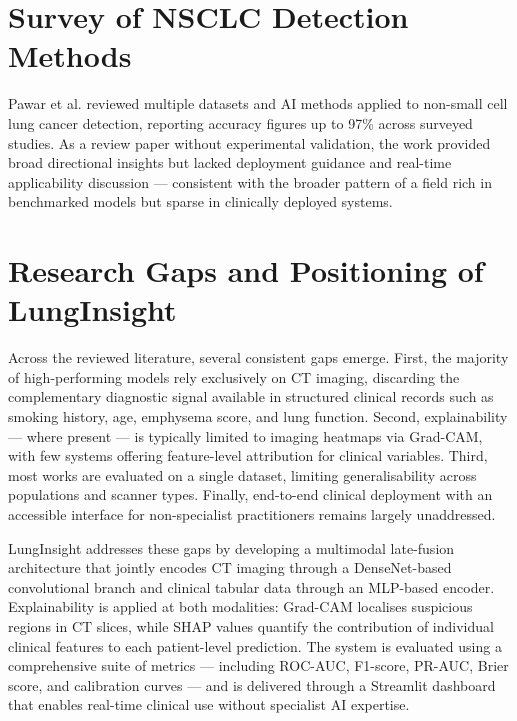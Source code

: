 {%
\section{Survey of NSCLC Detection Methods}

Pawar et al. \cite{pawar2025} reviewed multiple datasets and AI methods applied to
non-small cell lung cancer detection, reporting accuracy figures up to 97\% across
surveyed studies. As a review paper without experimental validation, the work provided
broad directional insights but lacked deployment guidance and real-time applicability
discussion — consistent with the broader pattern of a field rich in benchmarked models
but sparse in clinically deployed systems.

\section{Research Gaps and Positioning of LungInsight}

Across the reviewed literature, several consistent gaps emerge. First, the majority of
high-performing models rely exclusively on CT imaging, discarding the complementary
diagnostic signal available in structured clinical records such as smoking history, age,
emphysema score, and lung function. Second, explainability — where present — is typically
limited to imaging heatmaps via Grad-CAM, with few systems offering feature-level
attribution for clinical variables. Third, most works are evaluated on a single dataset,
limiting generalisability across populations and scanner types. Finally, end-to-end
clinical deployment with an accessible interface for non-specialist practitioners remains
largely unaddressed.

LungInsight addresses these gaps by developing a multimodal late-fusion architecture that
jointly encodes CT imaging through a DenseNet-based convolutional branch and clinical
tabular data through an MLP-based encoder. Explainability is applied at both modalities:
Grad-CAM localises suspicious regions in CT slices, while SHAP values quantify the
contribution of individual clinical features to each patient-level prediction. The system
is evaluated using a comprehensive suite of metrics — including ROC-AUC, F1-score,
PR-AUC, Brier score, and calibration curves — and is delivered through a Streamlit
dashboard that enables real-time clinical use without specialist AI expertise.

}

